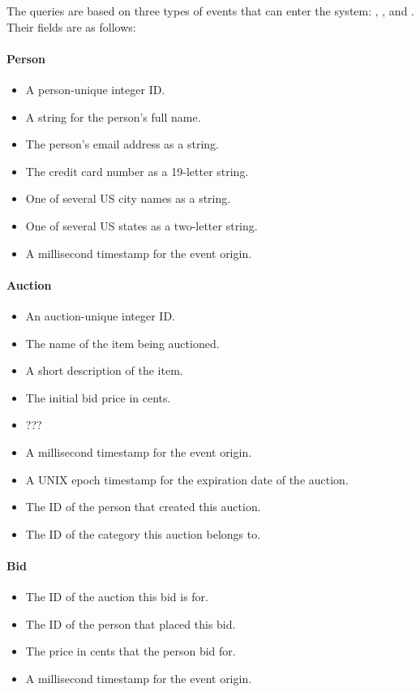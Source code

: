 The queries are based on three types of events that can enter the system: , , and . Their fields are as follows:

\paragraph*{Person}
\begin{itemize}
\item {} A person-unique integer ID.
\item {} A string for the person's full name.
\item {} The person's email address as a string.
\item {} The credit card number as a 19-letter string.
\item {} One of several US city names as a string.
\item {} One of several US states as a two-letter string.
\item {} A millisecond timestamp for the event origin.
\end{itemize}

\paragraph*{Auction}
\begin{itemize}
\item {} An auction-unique integer ID.
\item {} The name of the item being auctioned.
\item {} A short description of the item.
\item {} The initial bid price in cents.
\item {} ???
\item {} A millisecond timestamp for the event origin.
\item {} A UNIX epoch timestamp for the expiration date of the auction.
\item {} The ID of the person that created this auction.
\item {} The ID of the category this auction belongs to.
\end{itemize}

\paragraph*{Bid}
\begin{itemize}
\item {} The ID of the auction this bid is for.
\item {} The ID of the person that placed this bid.
\item {} The price in cents that the person bid for.
\item {} A millisecond timestamp for the event origin.
\end{itemize}


